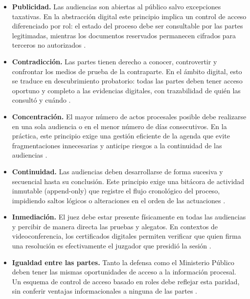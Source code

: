 \begin{itemize}
  \item \textbf{Publicidad.} Las audiencias son abiertas al público salvo excepciones taxativas. En la abstracción digital este principio implica un control de acceso diferenciado por rol: el estado del proceso debe ser consultable por las partes legitimadas, mientras los documentos reservados permanecen cifrados para terceros no autorizados \cite{cnpp2021}.

  \item \textbf{Contradicción.} Las partes tienen derecho a conocer, controvertir y confrontar los medios de prueba de la contraparte. En el ámbito digital, esto se traduce en descubrimiento probatorio: todas las partes deben tener acceso oportuno y completo a las evidencias digitales, con trazabilidad de quién las consultó y cuándo \cite{cnpp2021}.

  \item \textbf{Concentración.} El mayor número de actos procesales posible debe realizarse en una sola audiencia o en el menor número de días consecutivos. En la práctica, este principio exige una gestión eficiente de la agenda que evite fragmentaciones innecesarias y anticipe riesgos a la continuidad de las audiencias \cite{cnpp2021}.

  \item \textbf{Continuidad.} Las audiencias deben desarrollarse de forma sucesiva y secuencial hasta su conclusión. Este principio exige una bitácora de actividad inmutable (append-only) que registre el flujo cronológico del proceso, impidiendo saltos lógicos o alteraciones en el orden de las actuaciones \cite{cnpp2021}.

  \item \textbf{Inmediación.} El juez debe estar presente físicamente en todas las audiencias y percibir de manera directa las pruebas y alegatos. En contextos de videoconferencia, los certificados digitales permiten verificar que quien firma una resolución es efectivamente el juzgador que presidió la sesión \cite{cnpp2021}.

  \item \textbf{Igualdad entre las partes.} Tanto la defensa como el Ministerio Público deben tener las mismas oportunidades de acceso a la información procesal. Un esquema de control de acceso basado en roles debe reflejar esta paridad, sin conferir ventajas informacionales a ninguna de las partes \cite{cnpp2021}.
\end{itemize}

